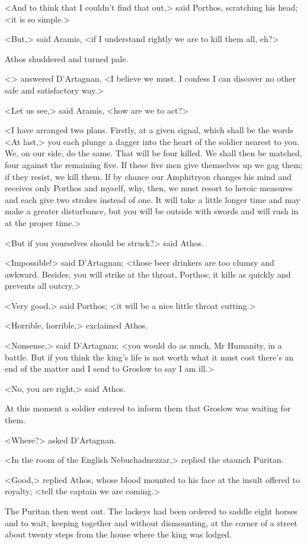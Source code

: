 <And to think that I couldn't find that out,> said Porthos, scratching his head; <it is so simple.>

<But,> said Aramis, <if I understand rightly we are to kill them all, eh?>

Athos shuddered and turned pale.

<> answered D'Artagnan, <I believe we must. I confess I can discover no other safe and satisfactory way.>

<Let us see,> said Aramis, <how are we to act?>

<I have arranged two plans. Firstly, at a given signal, which shall be the words <At last,> you each plunge a dagger into the heart of the soldier nearest to you. We, on our side, do the same. That will be four killed. We shall then be matched, four against the remaining five. If these five men give themselves up we gag them; if they resist, we kill them. If by chance our Amphitryon changes his mind and receives only Porthos and myself, why, then, we must resort to heroic measures and each give two strokes instead of one. It will take a little longer time and may make a greater disturbance, but you will be outside with swords and will rush in at the proper time.>

<But if you yourselves should be struck?> said Athos.

<Impossible!> said D'Artagnan; <those beer drinkers are too clumsy and awkward. Besides, you will strike at the throat, Porthos; it kills as quickly and prevents all outcry.>

<Very good,> said Porthos; <it will be a nice little throat cutting.>

<Horrible, horrible,> exclaimed Athos.

<Nonsense,> said D'Artagnan; <you would do as much, Mr Humanity, in a battle. But if you think the king's life is not worth what it must cost there's an end of the matter and I send to Groslow to say I am ill.>

<No, you are right,> said Athos.

At this moment a soldier entered to inform them that Groslow was waiting for them.

<Where?> asked D'Artagnan.

<In the room of the English Nebuchadnezzar,> replied the staunch Puritan.

<Good,> replied Athos, whose blood mounted to his face at the insult offered to royalty; <tell the captain we are coming.>

The Puritan then went out. The lackeys had been ordered to saddle eight horses and to wait, keeping together and without dismounting, at the corner of a street about twenty steps from the house where the king was lodged.

